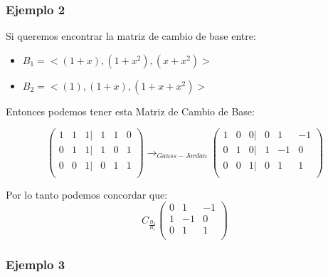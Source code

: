 \documentclass[12pt]{report}							    %
\begin{document}
        \subsubsection{Ejemplo 2}

        Si queremos encontrar la matriz de cambio de base entre:
        \begin{itemize}
            \item $B_1 = < (1+x), (1+x^2), (x+x^2) >$ 
            \item $B_2 = < (1), (1+x), (1+x+x^2) >$ 
        \end{itemize}

        Entonces podemos tener esta Matriz de Cambio de Base:

        \begin{equation*}
            \begin{pmatrix}
                1 & 1 & 1 | & 1 & 1 & 0 \\
                0 & 1 & 1 | & 1 & 0 & 1 \\
                0 & 0 & 1 | & 0 & 1 & 1 \\
            \end{pmatrix}
            \to_{Gauss-Jordan}
            \begin{pmatrix}
                1 & 0 & 0 | & 0 & 1 & -1 \\
                0 & 1 & 0 | & 1 & -1 & 0 \\
                0 & 0 & 1 | & 0 & 1 & 1 \\
            \end{pmatrix}
        \end{equation*}

        Por lo tanto podemos concordar que:
        \begin{equation*}
            C_{\frac{B_2}{B_1}}
            \begin{pmatrix}
                0 & 1 & -1 \\
                1 & -1 & 0 \\
                0 & 1 & 1  \\
            \end{pmatrix}
        \end{equation*}



        \subsubsection{Ejemplo 3}
\end{document}
